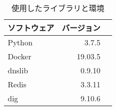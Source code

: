 \begin{table}[b]
 \caption{使用したライブラリと環境}
 \centering
  \begin{tabular}{lrr}
    \toprule
		\multicolumn{1}{c}{\textbf{ソフトウェア}} & \multicolumn{1}{c}{\textbf{バージョン}} \\
    \midrule
    Python & 3.7.5 \\
    Docker & 19.03.5 \\
    dnslib & 0.9.10 \\
    Redis & 3.3.11 \\
		dig & 9.10.6\\
    \bottomrule
  \end{tabular}
 \label{tab:software_version}
\end{table}

